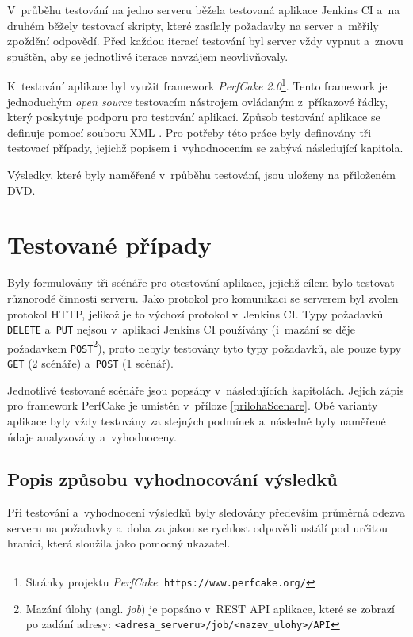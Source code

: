         V~průběhu testování na jedno serveru běžela testovaná aplikace Jenkins CI a~na druhém běžely testovací
        skripty, které zasílaly požadavky na server a~měřily zpoždění odpovědí.
        Před každou iterací testování byl server vždy vypnut a~znovu spuštěn, aby se jednotlivé
        iterace navzájem neovlivňovaly.
        \medskip

        K~testování aplikace byl využit framework \emph{PerfCake 2.0}\footnote{Stránky projektu \emph{PerfCake}: 
        \texttt{https://www.perfcake.org/}}. Tento framework je jednoduchým \emph{open source} testovacím nástrojem
        ovládaným z~příkazové řádky, 
        který poskytuje podporu pro testování aplikací. Způsob testování aplikace se definuje pomocí
        souboru XML \cite{perfcake}.
        Pro potřeby této práce byly definovány tři testovací případy, jejichž popisem i~vyhodnocením se 
        zabývá následující kapitola. 

        Výsledky, které byly naměřené v~rpůběhu testování, jsou uloženy na přiloženém DVD.
             
        

    \section{Testované případy} \label{testovanePripady}
        Byly formulovány tři scénáře pro otestování aplikace, jejichž cílem bylo testovat různorodé
        činnosti serveru.        
        Jako protokol pro komunikaci
        se serverem byl zvolen protokol HTTP, jelikož je to výchozí protokol v~Jenkins CI.
        Typy požadavků \texttt{DELETE} a~\texttt{PUT} nejsou v~aplikaci Jenkins CI používány (i~mazání
        se děje požadavkem \texttt{POST}\footnote{Mazání úlohy (angl. \emph{job}) je popsáno v~REST API aplikace,
        které se zobrazí po zadání adresy: \texttt{<adresa\_serveru>/job/<nazev\_ulohy>/API}}), 
        proto nebyly testovány tyto typy požadavků, ale pouze typy \texttt{GET} (2 scénáře) a~\texttt{POST} (1 scénář). 

        Jednotlivé testované scénáře jsou popsány v~následujících kapitolách. Jejich zápis
        pro framework PerfCake je umístěn v~příloze \ref{prilohaScenare}.
        Obě varianty aplikace byly vždy testovány za stejných podmínek a~následně byly naměřené údaje analyzovány
        a~vyhodnoceny.

        \subsection{Popis způsobu vyhodnocování výsledků} \label{zpusobVyhodnoceniVysledku}
            Při testování a~vyhodnocení výsledků byly sledovány především průměrná odezva serveru na požadavky
a~doba za jakou se rychlost odpovědi ustálí pod určitou hranici, 
            která sloužila jako pomocný ukazatel.
            
